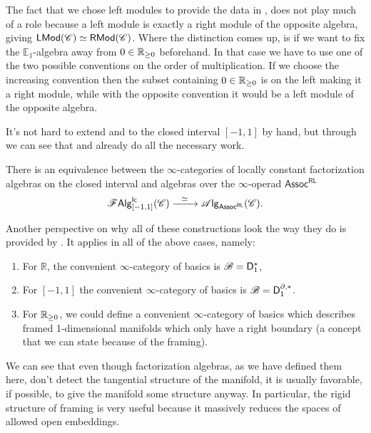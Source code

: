 \documentclass[../text.tex]{subfiles}
\begin{document}
\begin{remark}\label{rem:left_or_right_module}
    The fact that we chose left modules to provide the data in , does not play much of a role because a left module is exactly a right module of the opposite algebra, giving $\mathsf{LMod}(\mathscr{C}) \simeq \mathsf{RMod}(\mathscr{C})$. Where the distinction comes up, is if we want to fix the $\mathbb{E}_1$-algebra away from $0 \in \mathbb{R}_{\geq 0}$ beforehand. In that case we have to use one of the two possible conventions on the order of multiplication. If we choose the increasing convention then the subset containing $0 \in \mathbb{R}_{\geq 0}$ is on the left making it a right module, while with the opposite convention it would be a left module of the opposite algebra.
\end{remark}

It's not hard to extend  and  to the closed interval $[-1,1]$ by hand, but through  we can see that  and  already do all the necessary work.

\begin{corollary}\label{cor:lcfas_on_closed_int}
    There is an equivalence between the $\infty$-categories of locally constant factorization algebras on the closed interval and algebras over the $\infty$-operad $\mathsf{Assoc^{RL}}$
    \begin{equation}
        \lcfa_{[-1,1]} (\catC) \xrightarrow{\ \ \simeq \ \ } \alg{\mathsf{Assoc^{RL}}} (\catC).
    \end{equation} 
\end{corollary}

\begin{remark}
    Another perspective on why all of these constructions look the way they do is provided by . It applies in all of the above cases, namely:
    \begin{enumerate}
        \item For $\mathbb{R}$, the convenient $\infty$-category of basics is $\mathscr{B} = \mathsf{D}_1^*$,
        \item For $[-1,1]$ the convenient $\infty$-category of basics is $\mathscr{B} = \mathsf{D}_1^{\partial, *}$.
        \item For $\mathbb{R}_{\geq 0}$, we could define a convenient $\infty$-category of basics which describes framed 1-dimensional manifolds which only have a right boundary (a concept that we can state because of the framing).
    \end{enumerate}
    We can see that even though factorization algebras, as we have defined them here, don't detect the tangential structure of the manifold, it is usually favorable, if possible, to give the manifold some structure anyway. In particular, the rigid structure of framing is very useful because it massively reduces the spaces of allowed open embeddings.
\end{remark}
\end{document}
